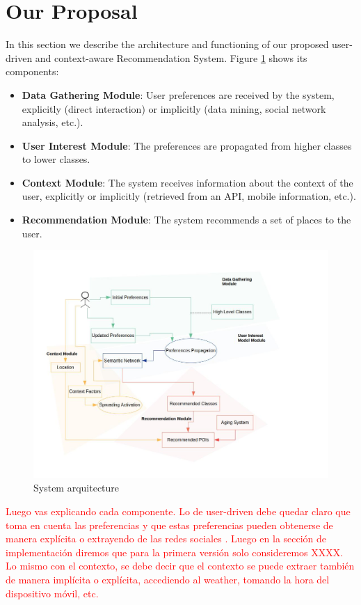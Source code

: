 \section{Our Proposal}
\label{sec:proposal}

In this section we describe the architecture and functioning of our proposed user-driven and context-aware Recommendation System. Figure \ref{fig:arquitecture} shows its components:
\begin{itemize}
    \item \textbf{Data Gathering Module}: User preferences are received by the system, explicitly (direct interaction) or implicitly (data mining, social network analysis, etc.).
    \item \textbf{User Interest Module}: The preferences are propagated from higher classes to lower classes.
    \item \textbf{Context Module}: The system receives information about the context of the user, explicitly or implicitly (retrieved from an API, mobile information, etc.).
    \item \textbf{Recommendation Module}: The system recommends a set of places to the user.
\end{itemize}

\begin{figure}[h]
\centering
\includegraphics[scale=0.4]{draws/arquitecture.jpg}
\caption{System arquitecture}
\label{fig:arquitecture}
\end{figure}

\textcolor{red}{Luego vas explicando cada componente. Lo de user-driven debe quedar claro que toma en cuenta las preferencias y que estas preferencias pueden obtenerse de manera explícita o extrayendo de las redes sociales . Luego en la sección de implementación diremos que para la primera versión solo consideremos XXXX. Lo mismo con el contexto, se debe decir que el contexto se puede extraer también de manera implícita o explícita, accediendo al weather, tomando la hora del dispositivo móvil, etc. }

